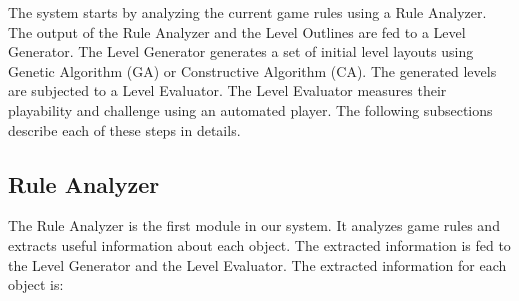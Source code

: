 \documentclass[letterpaper]{article}
\begin{document}
The system starts by analyzing the current game rules using a Rule Analyzer. The output of the Rule Analyzer and the Level Outlines are fed to a Level Generator. The Level Generator generates a set of initial level layouts using Genetic Algorithm (GA) or Constructive Algorithm (CA). The generated levels are subjected to a Level Evaluator. The Level Evaluator measures their playability and challenge using an automated player. The following subsections describe each of these steps in details.

\subsection{Rule Analyzer}
The Rule Analyzer is the first module in our system. It analyzes game rules and extracts useful information about each object. The extracted information is fed to the Level Generator and the Level Evaluator. The extracted information for each object is:
\end{document}
